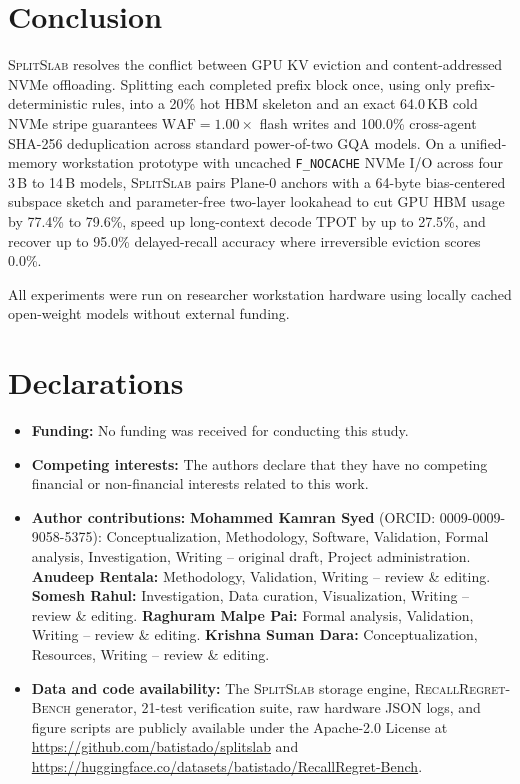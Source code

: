 \documentclass[pdflatex,sn-mathphys-num]{sn-jnl}
\theoremstyle{thmstyleone}
\newcommand{\SplitSlab}{\textsc{SplitSlab}}
\newcommand{\RecallBench}{\textsc{RecallRegret-Bench}}
\newcommand{\WAF}{\mathrm{WAF}}
\begin{document}
\section{Conclusion}\label{sec:conclusion}

\SplitSlab{} resolves the conflict between GPU KV eviction and content-addressed NVMe offloading. Splitting each completed prefix block once, using only prefix-deterministic rules, into a 20\% hot HBM skeleton and an exact 64.0\,KB cold NVMe stripe guarantees $\WAF = 1.00\times$ flash writes and 100.0\% cross-agent SHA-256 deduplication across standard power-of-two GQA models. On a unified-memory workstation prototype with uncached \texttt{F\_NOCACHE} NVMe I/O across four 3\,B to 14\,B models, \SplitSlab{} pairs Plane-0 anchors with a 64-byte bias-centered subspace sketch and parameter-free two-layer lookahead to cut GPU HBM usage by 77.4\% to 79.6\%, speed up long-context decode TPOT by up to 27.5\%, and recover up to 95.0\% delayed-recall accuracy where irreversible eviction scores 0.0\%.

\backmatter

All experiments were run on researcher workstation hardware using locally cached open-weight models without external funding.

\section*{Declarations}

\begin{itemize}
  \item \textbf{Funding:} No funding was received for conducting this study.
  \item \textbf{Competing interests:} The authors declare that they have no competing financial or non-financial interests related to this work.
  \item \textbf{Author contributions:} \textbf{Mohammed Kamran Syed} (ORCID: 0009-0009-9058-5375): Conceptualization, Methodology, Software, Validation, Formal analysis, Investigation, Writing -- original draft, Project administration. \textbf{Anudeep Rentala:} Methodology, Validation, Writing -- review \& editing. \textbf{Somesh Rahul:} Investigation, Data curation, Visualization, Writing -- review \& editing. \textbf{Raghuram Malpe Pai:} Formal analysis, Validation, Writing -- review \& editing. \textbf{Krishna Suman Dara:} Conceptualization, Resources, Writing -- review \& editing.
  \item \textbf{Data and code availability:} The \SplitSlab{} storage engine, \RecallBench{} generator, 21-test verification suite, raw hardware JSON logs, and figure scripts are publicly available under the Apache-2.0 License at \url{https://github.com/batistado/splitslab} and \url{https://huggingface.co/datasets/batistado/RecallRegret-Bench}.
\end{itemize}
\end{document}
